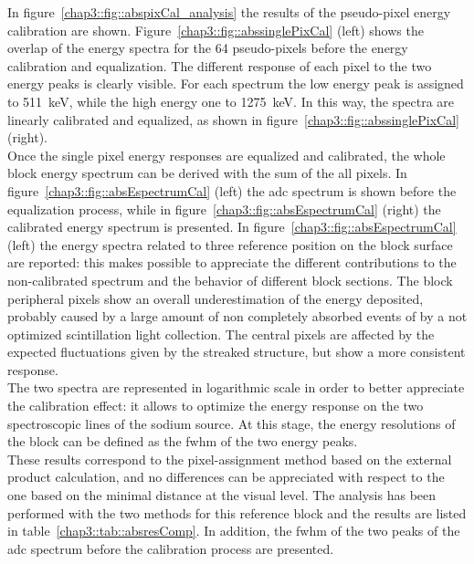 In figure~\ref{chap3::fig::abspixCal_analysis} the results of the pseudo-pixel energy calibration are shown. Figure~\ref{chap3::fig::abssinglePixCal} (left) shows the overlap of the energy spectra for the 64 pseudo-pixels before the energy calibration and equalization. The different response of each pixel to the two energy peaks is clearly visible. For each spectrum the low energy peak is assigned to 511~keV, while the high energy one to 1275~keV. In this way, the spectra are linearly calibrated and equalized, as shown in figure~\ref{chap3::fig::abssinglePixCal} (right).\\
Once the single pixel energy responses are equalized and calibrated, the whole block energy spectrum can be derived with the sum of the all pixels. In figure~\ref{chap3::fig::absEspectrumCal} (left) the \gls{adc} spectrum is shown before the equalization process, while in figure~\ref{chap3::fig::absEspectrumCal} (right) the calibrated energy spectrum is presented. In figure~\ref{chap3::fig::absEspectrumCal} (left) the energy spectra related to three reference position on the block surface are reported: this makes possible to appreciate  the different contributions to the non-calibrated spectrum and the behavior of different block sections. The block peripheral pixels show an overall underestimation of the energy deposited, probably caused by a large amount of non completely absorbed events of by a not optimized scintillation light collection. The central pixels are affected by the expected fluctuations given by the streaked structure, but show a more consistent response.\\
The two spectra are represented in logarithmic scale in order to better appreciate the calibration effect: it allows to optimize the energy response on the two spectroscopic lines of the sodium source. At this stage, the energy resolutions of the block can be defined as the \gls{fwhm} of the two energy peaks.\\
These results correspond to the pixel-assignment method based on the external product calculation, and no differences can be appreciated with respect to the one based on the minimal distance at the visual level. The analysis has been performed with the two methods for this reference block and the results are listed in table~\ref{chap3::tab::absresComp}. In addition, the \gls{fwhm} of the two peaks of the \gls{adc} spectrum before the calibration process are presented.


